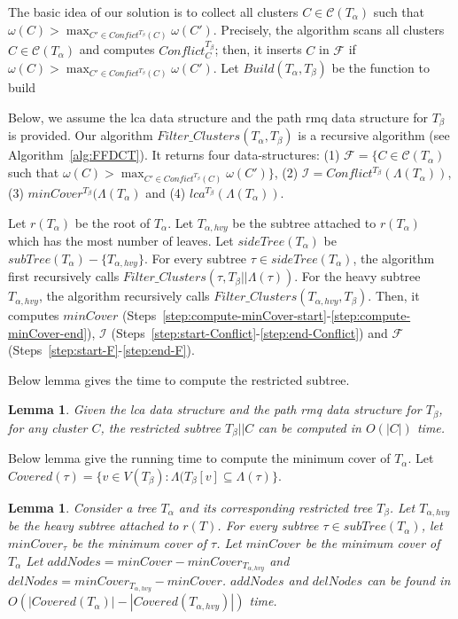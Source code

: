 \documentclass[final,1p,times]{elsarticle}
\newcommand{\weight}{\omega}
\newcommand{\TA}{T_\alpha}
\newcommand{\TB}{T_\beta}
\newtheorem{lemma}[theorem]{Lemma}
\begin{document}
    The basic idea of our solution is to collect all clusters $C \in \mathcal{C}(\TA)$ such that $\weight(C) > \max_{C' \in Confict^{\TB}(C)} \weight(C')$.
    Precisely, the algorithm scans all clusters $C \in \mathcal{C}(T_{\alpha})$ and computes $Conflict^{\TB}_{C}$; then, it inserts $C$ in $\mathcal{F}$ if $\weight(C) > \max_{C' \in Confict^{\TB}(C)} \weight(C')$.
    Let $Build(T_{\alpha}, T_{\beta})$ be the function to build


    Below, we assume the lca data structure and the path rmq data structure for $T_{\beta}$ is provided.
    Our algorithm $Filter\_Clusters(T_{\alpha}, T_{\beta})$ is a recursive algorithm (see Algorithm~\ref{alg:FFDCT}).
    It returns four data-structures: (1) $\mathcal{F} = \{ C \in \mathcal{C}(\TA)$ such that $\weight(C) > \max_{C' \in Confict^{\TB}(C)} \weight(C') \}$,
    (2) $\mathcal{I} = Conflict^{\TB}(\Lambda(\TA))$,
    (3) $minCover^{T_{\beta}}(\Lambda(T_{\alpha})$ and (4) $lca^{T_{\beta}}(\Lambda(\TA))$.

    Let $r(T_{\alpha})$ be the root of $T_{\alpha}$. Let $T_{\alpha,hvy}$ be the subtree attached to $r(T_{\alpha})$ which has the most number of leaves.
    Let $sideTree(T_{\alpha})$ be $subTree(T_{\alpha}) - \{ T_{\alpha,hvy} \}$.
    For every subtree $\tau \in sideTree(T_{\alpha})$, the algorithm first recursively calls $Filter\_Clusters(\tau, T_{\beta}||\Lambda(\tau))$.
    For the heavy subtree $T_{\alpha,hvy}$, the algorithm recursively calls $Filter\_Clusters(T_{\alpha,hvy}, T_{\beta})$.
    Then, it computes $minCover$ (Steps~\ref{step:compute-minCover-start}-\ref{step:compute-minCover-end}), $\mathcal{I}$ (Steps~\ref{step:start-Conflict}-\ref{step:end-Conflict}) and $\mathcal{F}$ (Steps~\ref{step:start-F}-\ref{step:end-F}).

    Below lemma gives the time to compute the restricted subtree.
    \begin{lemma}
	    Given the lca data structure and the path rmq data structure for $T_{\beta}$,
	    for any cluster $C$, the restricted subtree $T_{\beta}||C$ can be computed in $O(|C|)$ time.
    \end{lemma}

    Below lemma give the running time to compute the minimum cover of $T_{\alpha}$.
    Let $Covered(\tau) = \{ v \in V(T_{\beta}) : \Lambda(T_{\beta}[v] \subseteq \Lambda(\tau) \}$.
    \begin{lemma}
	    Consider a tree $T_{\alpha}$ and its corresponding restricted tree $T_{\beta}$. Let $T_{\alpha,hvy}$ be the heavy subtree attached to $r(T)$.
	    For every subtree $\tau \in subTree(T_{\alpha})$, let $minCover_{\tau}$ be the minimum cover of $\tau$.
	    Let $minCover$ be the minimum cover of $T_{\alpha}$
	    Let $addNodes = minCover - minCover_{T_{\alpha,hvy}}$ and $delNodes = minCover_{T_{\alpha,hvy}} - minCover$.
	    $addNodes$ and $delNodes$ can be found in $O(|Covered(T_{\alpha})| - |Covered(T_{\alpha,hvy})|)$ time.
    \end{lemma}
\end{document}
